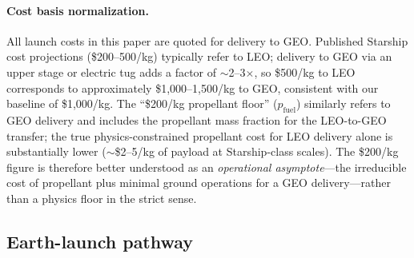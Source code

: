 \documentclass[preprint,12pt]{elsarticle}
\begin{document}
\paragraph{Cost basis normalization.} All launch costs in this paper are quoted for delivery to GEO. Published Starship cost projections (\$200--500/kg) typically refer to LEO; delivery to GEO via an upper stage or electric tug adds a factor of $\sim$2--3$\times$, so \$500/kg to LEO corresponds to approximately \$1,000--1,500/kg to GEO, consistent with our baseline of \$1,000/kg. The ``\$200/kg propellant floor'' ($p_{\mathrm{fuel}}$) similarly refers to GEO delivery and includes the propellant mass fraction for the LEO-to-GEO transfer; the true physics-constrained propellant cost for LEO delivery alone is substantially lower ($\sim$\$2--5/kg of payload at Starship-class scales). The \$200/kg figure is therefore better understood as an \emph{operational asymptote}---the irreducible cost of propellant plus minimal ground operations for a GEO delivery---rather than a physics floor in the strict sense.

\subsection{Earth-launch pathway}
\end{document}
